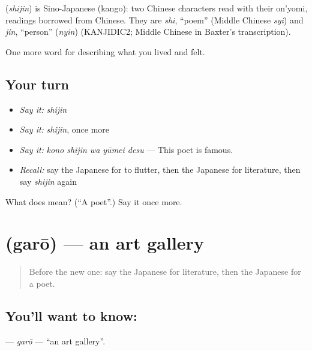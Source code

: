 \begin{cousinweb}
\textbf{} (\emph{shijin}) is Sino-Japanese (kango): two Chinese characters read with their on'yomi, readings borrowed from Chinese. They are \emph{shi}, \textquotedblleft{}poem\textquotedblright{} (Middle Chinese \emph{syi}) and \emph{jin}, \textquotedblleft{}person\textquotedblright{} (\emph{nyin}) (KANJIDIC2; Middle Chinese in Baxter's transcription).
\end{cousinweb}

\begin{grammarlens}[title={What you've built}]
One more word for describing what you lived and felt.
\end{grammarlens}

\subsection*{Your turn}
\begin{itemize}
\raggedright
  \item \emph{Say it:} \emph{shijin}
  \item \emph{Say it:} \emph{shijin}, once more
  \item \emph{Say it:} \emph{kono shijin wa yūmei desu} — This poet is famous.
  \item \emph{Recall:} say the Japanese for to flutter, then the Japanese for literature, then say \emph{shijin} again
\end{itemize}

\begin{tcolorbox}[breakable,colback=teal!4,colframe=teal!35!black,title={Before you move on}]
What does  mean? (\textquotedblleft{}A poet\textquotedblright{}.) Say it once more.
\end{tcolorbox}
\section[\texorpdfstring{\ja{がろう} (garō)}{がろう (garō)}]{ (garō) — an art gallery}

\label{lesson:JA-C504-garou}



\begin{quote}
Before the new one: say the Japanese for literature, then the Japanese for a poet.
\end{quote}

\subsection*{You'll want to know: }
\textbf{} — \emph{garō} — \textquotedblleft{}an art gallery\textquotedblright{}.


